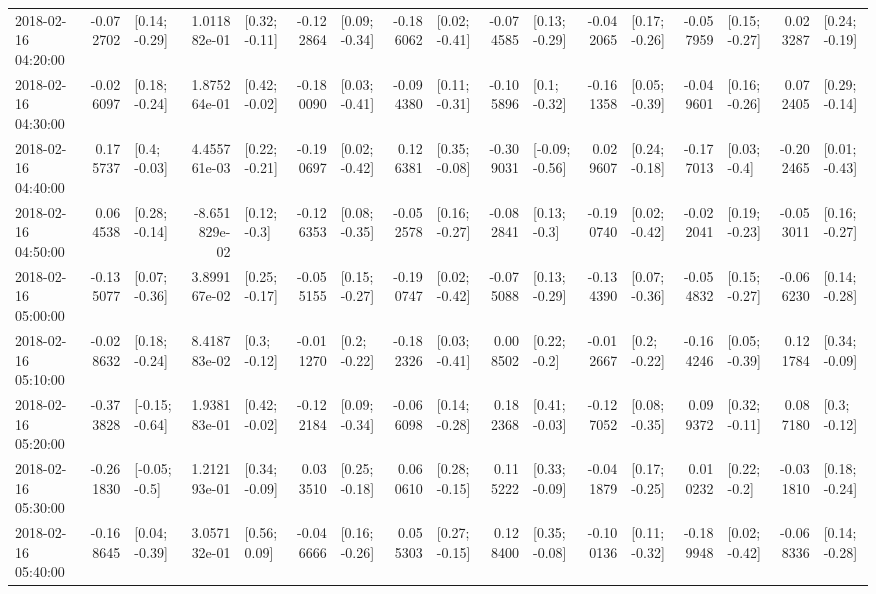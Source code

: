 \begin{tabular}{lrlrlrlrlrlrlrlrl}
2018-02-16 04:20:00 & -0.072702 &   [0.14; -0.29] &  1.011882e-01 &   [0.32; -0.11] & -0.122864 &   [0.09; -0.34] & -0.186062 &   [0.02; -0.41] & -0.074585 &   [0.13; -0.29] & -0.042065 &   [0.17; -0.26] & -0.057959 &   [0.15; -0.27] &  0.023287 &   [0.24; -0.19] \\
2018-02-16 04:30:00 & -0.026097 &   [0.18; -0.24] &  1.875264e-01 &   [0.42; -0.02] & -0.180090 &   [0.03; -0.41] & -0.094380 &   [0.11; -0.31] & -0.105896 &    [0.1; -0.32] & -0.161358 &   [0.05; -0.39] & -0.049601 &   [0.16; -0.26] &  0.072405 &   [0.29; -0.14] \\
2018-02-16 04:40:00 &  0.175737 &    [0.4; -0.03] &  4.455761e-03 &   [0.22; -0.21] & -0.190697 &   [0.02; -0.42] &  0.126381 &   [0.35; -0.08] & -0.309031 &  [-0.09; -0.56] &  0.029607 &   [0.24; -0.18] & -0.177013 &    [0.03; -0.4] & -0.202465 &   [0.01; -0.43] \\
2018-02-16 04:50:00 &  0.064538 &   [0.28; -0.14] & -8.651829e-02 &    [0.12; -0.3] & -0.126353 &   [0.08; -0.35] & -0.052578 &   [0.16; -0.27] & -0.082841 &    [0.13; -0.3] & -0.190740 &   [0.02; -0.42] & -0.022041 &   [0.19; -0.23] & -0.053011 &   [0.16; -0.27] \\
2018-02-16 05:00:00 & -0.135077 &   [0.07; -0.36] &  3.899167e-02 &   [0.25; -0.17] & -0.055155 &   [0.15; -0.27] & -0.190747 &   [0.02; -0.42] & -0.075088 &   [0.13; -0.29] & -0.134390 &   [0.07; -0.36] & -0.054832 &   [0.15; -0.27] & -0.066230 &   [0.14; -0.28] \\
2018-02-16 05:10:00 & -0.028632 &   [0.18; -0.24] &  8.418783e-02 &    [0.3; -0.12] & -0.011270 &    [0.2; -0.22] & -0.182326 &   [0.03; -0.41] &  0.008502 &    [0.22; -0.2] & -0.012667 &    [0.2; -0.22] & -0.164246 &   [0.05; -0.39] &  0.121784 &   [0.34; -0.09] \\
2018-02-16 05:20:00 & -0.373828 &  [-0.15; -0.64] &  1.938183e-01 &   [0.42; -0.02] & -0.122184 &   [0.09; -0.34] & -0.066098 &   [0.14; -0.28] &  0.182368 &   [0.41; -0.03] & -0.127052 &   [0.08; -0.35] &  0.099372 &   [0.32; -0.11] &  0.087180 &    [0.3; -0.12] \\
2018-02-16 05:30:00 & -0.261830 &   [-0.05; -0.5] &  1.212193e-01 &   [0.34; -0.09] &  0.033510 &   [0.25; -0.18] &  0.060610 &   [0.28; -0.15] &  0.115222 &   [0.33; -0.09] & -0.041879 &   [0.17; -0.25] &  0.010232 &    [0.22; -0.2] & -0.031810 &   [0.18; -0.24] \\
2018-02-16 05:40:00 & -0.168645 &   [0.04; -0.39] &  3.057132e-01 &    [0.56; 0.09] & -0.046666 &   [0.16; -0.26] &  0.055303 &   [0.27; -0.15] &  0.128400 &   [0.35; -0.08] & -0.100136 &   [0.11; -0.32] & -0.189948 &   [0.02; -0.42] & -0.068336 &   [0.14; -0.28] \\

\end{tabular}
